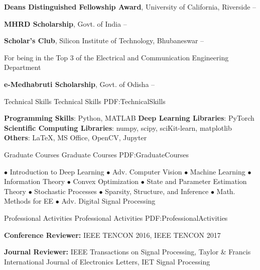 \documentclass[letterpaper,MMMyyyy,nonstopmode]{simpleresumecv}
\begin{document}
\begin{Body}
\BulletItem
\textbf{Deans Distinguished Fellowship Award}, University of California, Riverside
\hfill
{} --

\Gap
\BulletItem
\textbf{MHRD Scholarship}, Govt. of India
\hfill
{} --

\Gap
\BulletItem
\textbf{Scholar's Club}, Silicon Institute of Technology, Bhubaneswar
\hfill
{} --
\begin{Detail}
\SubBulletItem For being in the Top 3 of the Electrical and Communication Engineering Department
\end{Detail}

\Gap
\BulletItem
\textbf{e-Medhabruti Scholarship}, Govt. of Odisha
\hfill
{} --


\Section
{Technical Skills}
{Technical Skills}
{PDF:TechnicalSkills}

\Entry
\BulletItem \textbf{Programming Skills}: Python, MATLAB
\BulletItem \textbf{Deep Learning Libraries}: PyTorch \BulletItem \textbf{Scientific Computing Libraries}: numpy, scipy, sciKit-learn, matplotlib
\BulletItem \textbf{Others}: \LaTeX, MS Office, OpenCV, Jupyter


\Section
{Graduate Courses}
{Graduate Courses}
{PDF:GraduateCourses}

\Entry
 $\bullet$ Introduction to Deep Learning $\bullet$ Adv. Computer Vision $\bullet$ Machine Learning $\bullet$ Information Theory $\bullet$ Convex Optimization $\bullet$ State and Parameter Estimation Theory $\bullet$ Stochastic Processes $\bullet$ Sparsity, Structure, and Inference $\bullet$ Math. Methods for EE $\bullet$ Adv. Digital Signal Processing



\Section
{Professional Activities}
{Professional Activities}
{PDF:ProfessionalActivities}

\Entry
\textbf{Conference Reviewer:}
\newline
IEEE TENCON 2016, IEEE TENCON 2017

\Entry
\textbf{Journal Reviewer:}
\newline
IEEE Transactions on Signal Processing, Taylor \& Francis
International Journal of Electronics Letters, IET Signal Processing



\end{Body}
\end{document}
